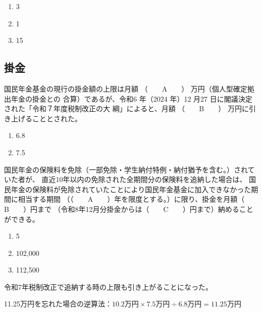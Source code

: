 \begin{answerbox}
  \begin{enumerate}[A: ]
    \item 3
    \item 1
    \item 15
  \end{enumerate}
\end{answerbox}


\newpage

\subsection{掛金}

\begin{fillblank}[年金1 2025 問題1(6)ア]
  国民年金基金の現行の掛金額の上限は月額 （　　A　　） 万円（個人型確定拠出年金の掛金との
合算）であるが、令和6 年（2024 年）12 月27 日に閣議決定された「令和７年度税制改正の大
綱」によると、月額 （　　B　　） 万円に引き上げることとされた。
\end{fillblank}

\begin{answerbox}
    \begin{enumerate}[A: ]
    \item 6.8
    \item 7.5
  \end{enumerate}
\end{answerbox}

\begin{fillblank}[自作 2026/10/31]
  国民年金の保険料を免除（一部免除・学生納付特例・納付猶予を含む。）されていた者が、
  直近10年以内の免除された全期間分の保険料を追納した場合は、
  国民年金の保険料が免除されていたことにより国民年金基金に加入できなかった期間に相当する期間
  （（　　A　　）年を限度とする。）に限り、掛金を月額（　　B　　）円まで
  （令和8年12月分掛金からは（　　C　　）円まで）納めることができる。
\end{fillblank}

\begin{answerbox}
    \begin{enumerate}[A: ]
    \item 5
    \item 102,000
    \item 112,500
  \end{enumerate} 
\end{answerbox}

\begin{explanationbox}
  令和7年税制改正で追納する時の上限も引き上がることになった。

11.25万円を忘れた場合の逆算法：$10.2万円\times7.5万円÷6.8万円=11.25万円$
\end{explanationbox}

